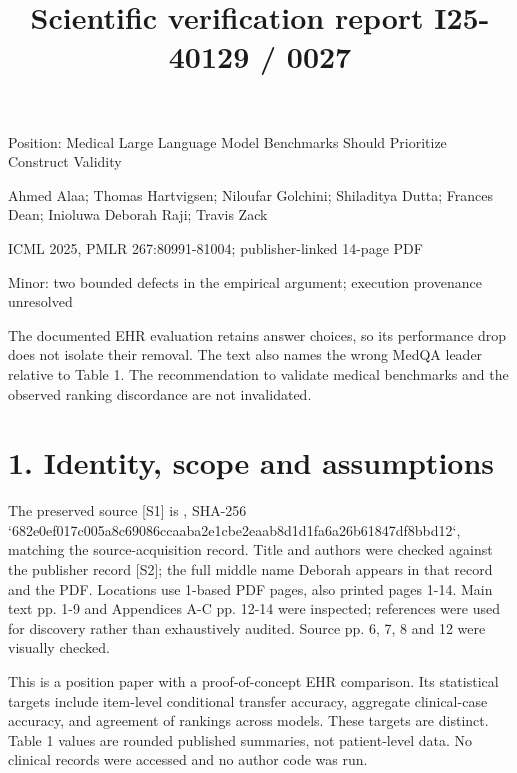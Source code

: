 \documentclass[10pt]{article}
\title{Scientific verification report
I25-40129 / 0027}
\author{}
\date{}
\begin{document}
\maketitle
Position: Medical Large Language Model Benchmarks Should Prioritize Construct Validity\par
Ahmed Alaa; Thomas Hartvigsen; Niloufar Golchini; Shiladitya Dutta; Frances Dean; Inioluwa Deborah Raji; Travis Zack\par
ICML 2025, PMLR 267:80991-81004; publisher-linked 14-page PDF\par
Minor: two bounded defects in the empirical argument; execution provenance unresolved\par
The documented EHR evaluation retains answer choices, so its performance drop does not isolate their removal. The text also names the wrong MedQA leader relative to Table 1. The recommendation to validate medical benchmarks and the observed ranking discordance are not invalidated.\par
\section*{1. Identity, scope and assumptions}
The preserved source [S1] is , SHA-256 `682e0ef017c005a8c69086ccaaba2e1cbe2eaab8d1d1fa6a26b61847df8bbd12`, matching the source-acquisition record. Title and authors were checked against the publisher record [S2]; the full middle name Deborah appears in that record and the PDF. Locations use 1-based PDF pages, also printed pages 1-14. Main text pp. 1-9 and Appendices A-C pp. 12-14 were inspected; references were used for discovery rather than exhaustively audited. Source pp. 6, 7, 8 and 12 were visually checked.\par
This is a position paper with a proof-of-concept EHR comparison. Its statistical targets include item-level conditional transfer accuracy, aggregate clinical-case accuracy, and agreement of rankings across models. These targets are distinct. Table 1 values are rounded published summaries, not patient-level data. No clinical records were accessed and no author code was run.\par
\end{document}
